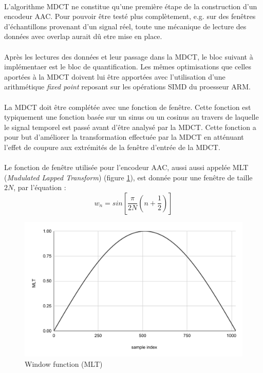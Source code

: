\documentclass{article}
\begin{document}
    \paragraph{}
    L'algorithme MDCT ne constitue qu'une première étape de la construction d'un encodeur AAC. Pour pouvoir être testé plus complètement, e.g. sur des fenêtres d'échantillons provenant d'un signal réel, toute une mécanique de lecture des données avec overlap aurait dû etre mise en place.
    
    \paragraph{}
    Après les lectures des données et leur passage dans la MDCT, le bloc suivant à implémentaer est le bloc de quantification. Les mêmes optimisations que celles aportées à la MDCT doivent lui être apportées avec l'utilisation d'une arithmétique \emph{fixed point} reposant sur les opérations SIMD du proesseur ARM.

    \paragraph{}
    La MDCT doit être complétée avec une fonction de fenêtre. Cette fonction est typiquement une fonction basée sur un sinus ou un cosinus au travers de laquelle le signal temporel est passé avant d'être analysé par la MDCT. Cette fonction a pour but d'améliorer la transformation effectuée par la MDCT en atténuant l'effet de coupure aux extrémités de la fenêtre d'entrée de la MDCT.

    \paragraph{}
    Le fonction de fenêtre utilisée pour l'encodeur AAC, aussi aussi appelée MLT (\emph{Mudulated Lapped Transform}) (figure \ref{fig:mlt}), est donnée pour une fenêtre de taille $2N$, par l'équation :
    $$w_n = sin\left[ \frac{\pi}{2N} \left( n + \frac{1}{2} \right) \right]$$
    \begin{figure}[H]
        \centering
        \includegraphics[width=.8\linewidth]{./images/mlt.pdf}
        \caption{Window function (MLT)}
        \label{fig:mlt}
    \end{figure}
\end{document}

